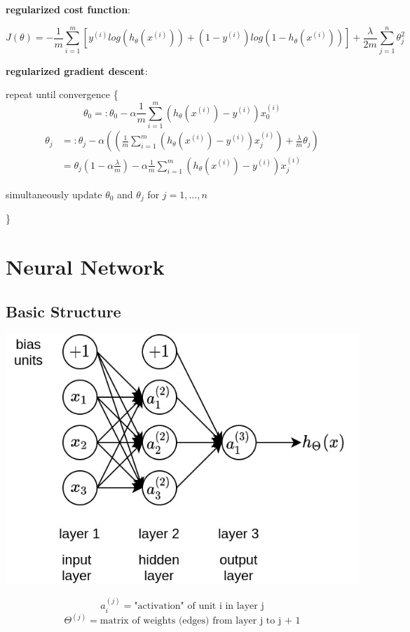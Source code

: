 \documentclass{article}
\begin{document}
\noindent \textbf{regularized cost function}:

\[J(\theta) = - \frac{1}{m} \sum_{i = 1}^{m} [y^{(i)} log(h_{\theta} (x^{(i)})) + (1 - y^{(i)}) log(1 - h_{\theta} (x^{(i)}))] + \frac{\lambda}{2m} \sum_{j = 1}^n \theta_j^2\]

\noindent \textbf{regularized gradient descent}:

\noindent repeat until convergence \{
\[\theta_0 =: \theta_0 - \alpha \frac{1}{m} \sum_{i = 1}^m (h_{\theta}(x^{(i)}) - y^{(i)}) x^{(i)}_0\]
\begin{equation*}
\begin{split}
\theta_j & =: \theta_j - \alpha ((\frac{1}{m} \sum_{i = 1}^m (h_{\theta}(x^{(i)}) - y^{(i)}) x^{(i)}_j) + \frac{\lambda}{m} \theta_j) \\
 & = \theta_j (1 - \alpha \frac{\lambda}{m}) - \alpha \frac{1}{m} \sum_{i = 1}^m (h_{\theta}(x^{(i)}) - y^{(i)}) x^{(i)}_j
\end{split}
\end{equation*}

\centerline{simultaneously update \(\theta_0\) and \(\theta_j\) for \(j = 1, \dots, n\)}
\}

\section{Neural Network}

\subsection{Basic Structure}

\begin{center}
\includegraphics[scale=0.4]{./images/neural_network.jpg}
\end{center}
\[a_i^{(j)} = \text{"activation" of unit i in layer j}\]
\[\Theta^{(j)} = \text{matrix of weights (edges) from layer j to j + 1}\]
\end{document}
